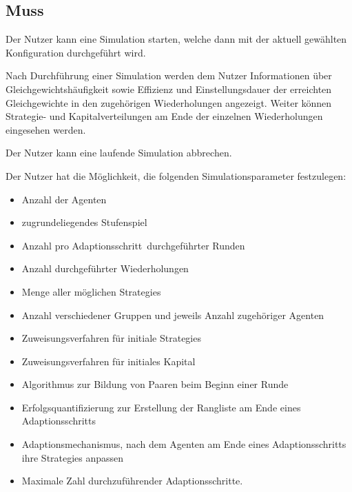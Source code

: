 \documentclass[parskip=full,11pt]{scrartcl}
\def\adapt{Adaptionsschritt}
\def\adapts{Adaptionsschritte}
\begin{document}
\subsection{Muss}


Der \Gls{Nutzer} kann eine Simulation starten, welche dann mit der aktuell gewählten Konfiguration durchgeführt wird.


Nach Durchführung einer Simulation werden dem \Gls{Nutzer} Informationen über Gleichgewichtshäufigkeit sowie \Gls{Effizienz} und \Gls{Einstellungsdauer} der erreichten Gleichgewichte in den zugehörigen Wiederholungen angezeigt. Weiter können Strategie- und Kapitalverteilungen am Ende der einzelnen Wiederholungen eingesehen werden.


Der \Gls{Nutzer} kann eine laufende Simulation abbrechen.


Der \Gls{Nutzer} hat die Möglichkeit, die folgenden Simulationsparameter festzulegen:
\begin{itemize} \itemsep -10pt
\item Anzahl der Agenten
\item zugrundeliegendes Stufenspiel
\item Anzahl pro \adapt\ durchgeführter Runden
\item Anzahl durchgeführter Wiederholungen
\item Menge aller möglichen \Glspl{Strategie}
\item Anzahl verschiedener Gruppen und jeweils Anzahl zugehöriger Agenten
\item Zuweisungsverfahren für initiale \Glspl{Strategie}
\item Zuweisungsverfahren für initiales Kapital
\item Algorithmus zur Bildung von Paaren beim Beginn einer Runde
\item Erfolgsquantifizierung zur Erstellung der Rangliste am Ende eines \adapt s
\item Adaptionsmechanismus, nach dem Agenten am Ende eines \adapt s ihre \Glspl{Strategie} anpassen
\item Maximale Zahl durchzuführender \adapts.
\end{itemize}
\end{document}

